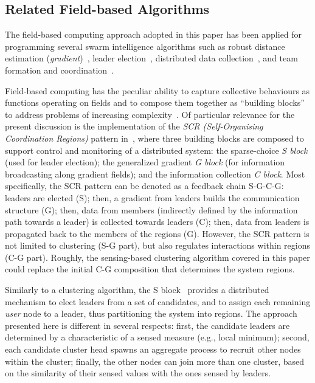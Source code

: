 \subsection{Related Field-based Algorithms}
\label{s:rw:related-ac-algorithms}


The field-based computing approach adopted in this paper has been applied for
 programming several swarm intelligence algorithms
 such as robust distance estimation (\emph{gradient})~\cite{DBLP:conf/saso/AudritoCDV17},
 leader election~\cite{DBLP:conf/saso/MoBD18},
 distributed data collection~\cite{audrito2021jcee-distributed-collection},
 and team formation and coordination~\cite{DBLP:journals/eaai/CasadeiVAPD21}.

Field-based computing has the peculiar ability to capture collective behaviours as functions operating on fields
and to compose them together as ``building blocks'' to address problems of increasing complexity~\cite{DBLP:journals/jlap/ViroliBDACP19}.
%
Of particular relevance for the present discussion is the implementation of the \emph{SCR (Self-Organising Coordination Regions)} pattern in~\cite{DBLP:journals/fgcs/PianiniCVN21}, where three building blocks are composed to support control and monitoring of a distributed system: the sparse-choice \emph{S block} (used for leader election); the generalized gradient \emph{G block} (for information broadcasting along gradient fields); and the information collection \emph{C block}.
%
Most specifically, the SCR pattern can be denoted as a feedback chain S-G-C-G: leaders are elected (S); then, a gradient from leaders builds the communication structure (G); then, data from members (indirectly defined by the information path towards a leader) is collected towards leaders (C); then, data from leaders is propagated back to the members of the regions (G).
%
However, the SCR pattern is not limited to clustering (S-G part), but also regulates interactions within regions (C-G part).
%
Roughly, the sensing-based clustering algorithm
 covered in this paper could replace the initial C-G composition
 that determines the system regions.

Similarly to a clustering algorithm, the S block~\cite{DBLP:conf/saso/MoBD18} provides a distributed mechanism to elect leaders from a set of candidates, and to assign each remaining {\em user} node to a leader, thus partitioning the system into regions. The approach presented here is different in several respects: first, the candidate leaders are determined by a characteristic of a sensed measure (e.g., local minimum); second, each candidate cluster head spawns an aggregate process to recruit other nodes within the cluster; finally, the other nodes can join more than one cluster, based on the similarity of their sensed values with the ones sensed by leaders.


